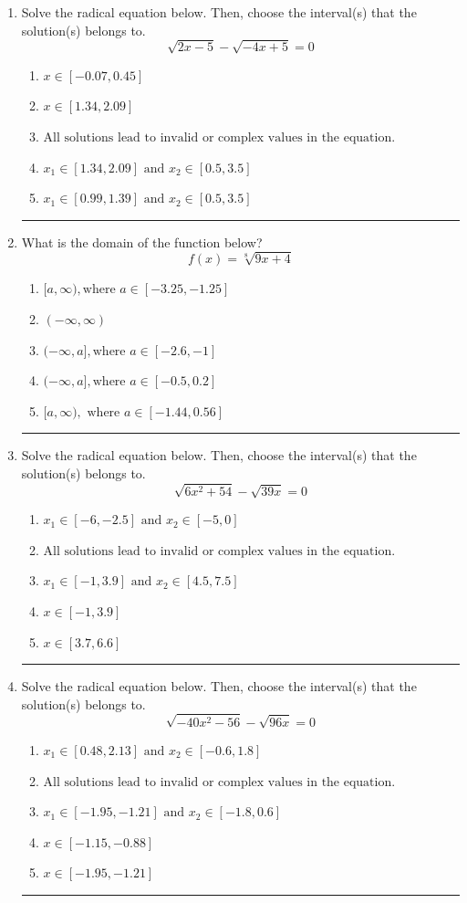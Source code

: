 \documentclass[14pt]{extbook}
\newcommand{\litem}[1]{\item#1\hspace*{-1cm}\rule{\textwidth}{0.4pt}}
\begin{document}
\begin{enumerate}
\litem{
Solve the radical equation below. Then, choose the interval(s) that the solution(s) belongs to.\[ \sqrt{2 x - 5} - \sqrt{-4 x + 5} = 0 \]\begin{enumerate}[label=\Alph*.]
\item \( x \in [-0.07,0.45] \)
\item \( x \in [1.34,2.09] \)
\item \( \text{All solutions lead to invalid or complex values in the equation.} \)
\item \( x_1 \in [1.34, 2.09] \text{ and } x_2 \in [0.5,3.5] \)
\item \( x_1 \in [0.99, 1.39] \text{ and } x_2 \in [0.5,3.5] \)

\end{enumerate} }
\litem{
What is the domain of the function below?\[ f(x) = \sqrt[8]{9 x + 4} \]\begin{enumerate}[label=\Alph*.]
\item \( [a, \infty), \text{where } a \in [-3.25, -1.25] \)
\item \( (-\infty, \infty) \)
\item \( (-\infty, a], \text{where } a \in [-2.6, -1] \)
\item \( (-\infty, a], \text{where } a \in [-0.5, 0.2] \)
\item \( [a, \infty), \text{ where } a \in [-1.44, 0.56] \)

\end{enumerate} }
\litem{
Solve the radical equation below. Then, choose the interval(s) that the solution(s) belongs to.\[ \sqrt{6 x^2 + 54} - \sqrt{39 x} = 0 \]\begin{enumerate}[label=\Alph*.]
\item \( x_1 \in [-6, -2.5] \text{ and } x_2 \in [-5,0] \)
\item \( \text{All solutions lead to invalid or complex values in the equation.} \)
\item \( x_1 \in [-1, 3.9] \text{ and } x_2 \in [4.5,7.5] \)
\item \( x \in [-1,3.9] \)
\item \( x \in [3.7,6.6] \)

\end{enumerate} }
\litem{
Solve the radical equation below. Then, choose the interval(s) that the solution(s) belongs to.\[ \sqrt{-40 x^2 - 56} - \sqrt{96 x} = 0 \]\begin{enumerate}[label=\Alph*.]
\item \( x_1 \in [0.48, 2.13] \text{ and } x_2 \in [-0.6,1.8] \)
\item \( \text{All solutions lead to invalid or complex values in the equation.} \)
\item \( x_1 \in [-1.95, -1.21] \text{ and } x_2 \in [-1.8,0.6] \)
\item \( x \in [-1.15,-0.88] \)
\item \( x \in [-1.95,-1.21] \)


\end{enumerate}}
\end{enumerate}
\end{document}
